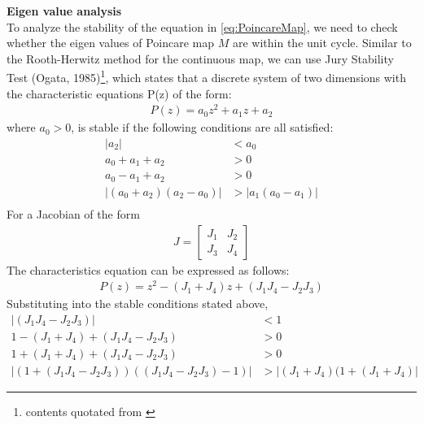 \noindent \textbf{Eigen value analysis}\\
To analyze the stability of the equation in \ref{eq:PoincareMap}, we need to check whether the eigen values of Poincare map $M$ are within the unit cycle. Similar to the Rooth-Herwitz method for the continuous map, we can use Jury Stability Test (Ogata, 1985)\footnote{contents quotated from \cite{Cham2002}}, which states that a discrete system of two dimensions with the characteristic equations P(z) of the form:
\begin{align*}
P(z) = a_0z^2 + a_1z + a_2
\end{align*}
where $a_0>0$, is stable if the following conditions are all satisfied:
\begin{align*}
|a_2|&<a_0\\
a_0+a_1+a_2&>0\\
a_0-a_1+a_2&>0\\
|(a_0+a_2)(a_2-a_0)|&>|a_1(a_0-a_1)|\\
\end{align*}
For a Jacobian of the form 
\begin{align*}
J = \begin{bmatrix}
J_1 & J_2 \\
J_3 & J_4
\end{bmatrix}
\end{align*}
The characteristics equation can be expressed as follows:
\begin{align*}
P(z) = z^2-(J_1+J_4)z +(J_1J_4-J_2J_3)
\end{align*}
Substituting into the stable conditions stated above,
\begin{align}
\label{eq:condition1}
|(J_1J_4-J_2J_3)|&<1\\
\label{eq:condition2}
1-(J_1+J_4)+(J_1J_4-J_2J_3)&>0\\
\label{eq:condition3}
1+(J_1+J_4)+(J_1J_4-J_2J_3)&>0\\
\label{eq:condition4}
|(1+(J_1J_4-J_2J_3))((J_1J_4-J_2J_3)-1)|&>|(J_1+J_4)(1+(J_1+J_4)|
\end{align}

